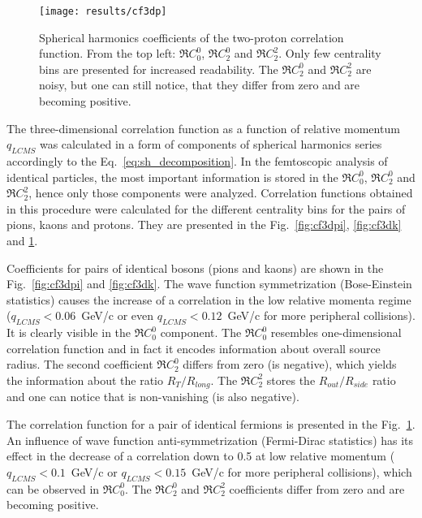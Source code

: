       \begin{figure}[b]
        \centering
        \centerline{\texttt{[image: results/cf3dp]}}
        \caption{Spherical harmonics coefficients of the two-proton correlation function. From the top left: $\Re C^0_0$, $\Re C^0_2$ and $\Re C^2_2$. Only few centrality bins are presented for increased readability. The $\Re C^0_2$ and $\Re C^2_2$ are noisy, but one can still notice, that they differ from zero and are becoming positive.}
      \label{fig:cf3dp}
      \end{figure}

      The three-dimensional correlation function as a function of relative momentum $q_{LCMS}$ was calculated in a form of components of spherical harmonics series accordingly to the Eq.~\ref{eq:sh_decomposition}.
      In the femtoscopic analysis of identical particles, the most important information is stored in the $\Re C^0_0$, $\Re C^0_2$ and $\Re C^2_2$, hence only those components were analyzed.
      Correlation functions obtained in this procedure were calculated for the different centrality bins for the pairs of pions, kaons and protons.
      They are presented in the Fig.~\ref{fig:cf3dpi}, \ref{fig:cf3dk} and \ref{fig:cf3dp}.
      
      Coefficients for pairs of identical bosons (pions and kaons) are shown in the Fig.~\ref{fig:cf3dpi} and \ref{fig:cf3dk}.
      The wave function symmetrization (Bose-Einstein statistics) causes the increase of a correlation in the low relative momenta regime ($q_{LCMS}<0.06$~GeV/c or even $q_{LCMS}<0.12$~GeV/c for more peripheral collisions).
      It is clearly visible in the $\Re C^0_0$ component.
      The $\Re C_0^0$ resembles one-dimensional correlation function and in fact it encodes information about overall source radius.
      The second coefficient $\Re C^0_2$ differs from zero (is negative), which yields the information about the ratio $R_T / R_{long}$.
      The $\Re C^2_2$ stores the $R_{out} / R_{side}$ ratio and one can notice that is non-vanishing (is also negative).

      The correlation function for a pair of identical fermions is presented in the Fig.~\ref{fig:cf3dp}.
      An influence of wave function anti-symmetrization (Fermi-Dirac statistics) has its effect in the decrease of a correlation down to 0.5 at low relative momentum ($q_{LCMS}<0.1$~GeV/c or $q_{LCMS}<0.15$~GeV/c for more peripheral collisions), which can be observed in $\Re C^0_0$.
      The $\Re C^0_2$ and $\Re C^2_2$ coefficients differ from zero and are becoming positive.

